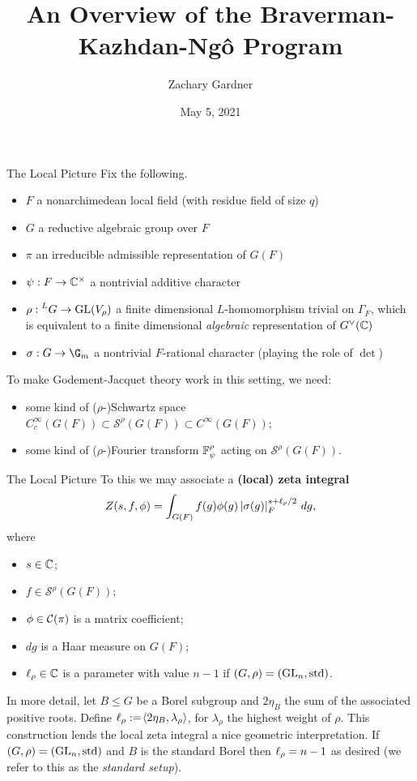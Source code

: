 \documentclass[aspectratio=1610]{beamer}
\title{An Overview of the Braverman-Kazhdan-Ng\^{o} Program}
\author{Zachary Gardner}
\date{May 5, 2021}
\renewcommand{\S}{\mathscr{S}}
\newcommand{\std}{\textup{std}}
\begin{document}
\begin{frame}
\titlepage
\end{frame}

\begin{frame}{The Local Picture}
Fix the following.
\begin{itemize}
\pause\item $F$ a nonarchimedean local field (with residue field of size $q$)
\pause\item $G$ a reductive algebraic group over $F$
\pause\item $\pi$ an irreducible admissible representation of $G(F)$
\pause\item $\psi: F\to\mathbb{C}^{\times}$ a nontrivial additive character
\pause\item $\rho: \prescript{L}{}G\to\textup{GL}(V_{\rho})$ a finite dimensional $L$-homomorphism trivial on $\Gamma_F$, which is equivalent to a finite dimensional \emph{algebraic} representation of $G^{\vee}(\mathbb{C})$
\pause\item $\sigma: G\to\G_m$ a nontrivial $F$-rational character (playing the role of $\det$)
\end{itemize}
\pause To make Godement-Jacquet theory work in this setting, we need:
\begin{itemize}
\pause\item some kind of ($\rho$-)Schwartz space $C_c^{\infty}(G(F))\subset\S^{\rho}(G(F))\subset C^{\infty}(G(F))$;
\pause\item some kind of ($\rho$-)Fourier transform $\mathbb{F}_{\psi}^{\rho}$ acting on $\S^{\rho}(G(F))$.
\end{itemize}
\end{frame}

\begin{frame}{The Local Picture}
\pause To this we may associate a \textbf{(local) zeta integral}
$$Z(s,f,\phi)=\int_{G(F)}f(g)\phi(g)\left\lvert\sigma(g)\right\rvert_F^{s+\ell_{\rho}/2}\,dg,$$
where
\begin{itemize}
\pause\item $s\in\mathbb{C}$;
\pause\item $f\in\S^{\rho}(G(F))$;
\pause\item $\phi\in\mathcal{C}(\pi)$ is a matrix coefficient;
\pause\item $dg$ is a Haar measure on $G(F)$;
\pause\item $\ell_{\rho}\in\mathbb{C}$ is a parameter with value $n-1$ if $(G,\rho)=(\GL_n,\std)$.
\end{itemize}
\pause In more detail, let $B\leq G$ be a Borel subgroup and $2\eta_B$ the sum of the associated positive roots. Define $\ell_{\rho}:=\!\left\langle2\eta_B,\lambda_{\rho}\right\rangle$, for $\lambda_{\rho}$ the highest weight of $\rho$. \pause This construction lends the local zeta integral a nice geometric interpretation. \pause If $(G,\rho)=(\GL_n,\std)$ and $B$ is the standard Borel then $\ell_{\rho}=n-1$ as desired (we refer to this as the \emph{standard setup}).
\end{frame}
\end{document}

